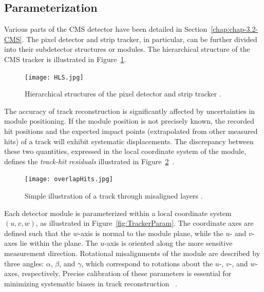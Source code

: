 \subsection{Parameterization}

Various parts of the CMS detector have been detailed in Section~\ref{chap:chap-3.2-CMS}. The pixel detector and strip tracker, in particular, can be further divided into their subdetector structures or modules. The hierarchical structure of the CMS tracker is illustrated in Figure~\ref{fig:HLS}. 

\begin{figure}[!htb]
    \begin{center}
        \texttt{[image: HLS.jpg]}
        \caption{Hierarchical structures of the pixel detector and strip tracker \cite{WAdam_2009}.}
        \label{fig:HLS}
    \end{center}
\end{figure}

The accuracy of track reconstruction is significantly affected by uncertainties in module positioning. If the module position is not precisely known, the recorded hit positions and the expected impact points (extrapolated from other measured hits) of a track will exhibit systematic displacements. The discrepancy between these two quantities, expressed in the local coordinate system of the module, defines the \emph{track-hit residuals} illustrated in Figure~\ref{fig:overlapHits}~\cite{Karimaki:926537}.  

\begin{figure}[!htb]
    \begin{center}
        \texttt{[image: overlapHits.jpg]}
        \caption{Simple illustration of a track through misaligned layers \cite{2022166795}.}
        \label{fig:overlapHits}
    \end{center}
\end{figure}

Each detector module is parameterized within a local coordinate system $(u, v, w)$, as illustrated in Figure~\ref{fig:TrackerParam}. The coordinate axes are defined such that the $w$-axis is normal to the module plane, while the $u$- and $v$-axes lie within the plane. The $u$-axis is oriented along the more sensitive measurement direction. Rotational misalignments of the module are described by three angles: $\alpha$, $\beta$, and $\gamma$, which correspond to rotations about the $u$-, $v$-, and $w$-axes, respectively. Precise calibration of these parameters is essential for minimizing systematic biases in track reconstruction ~\cite{Karimaki:926537, Karimaki:2003bd}.

